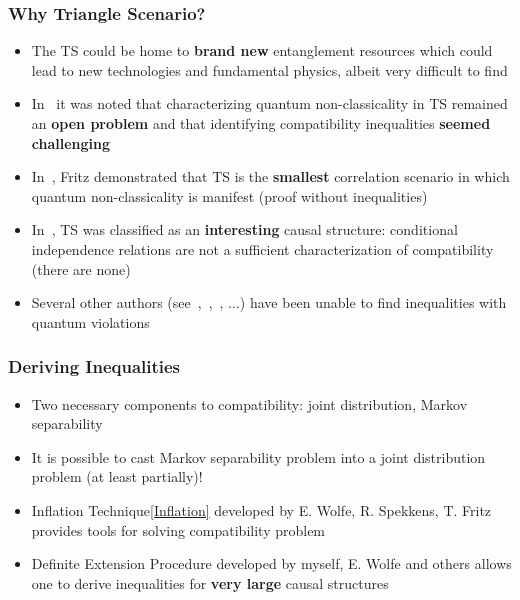 \documentclass[
    hyperref={bookmarks=false},%
    xcolor={dvipsnames},
]{beamer}
\renewcommand{\term}[1]{\textcolor{Mahogany}{#1}}
\begin{document}
\begin{frame}
    \frametitle{Why Triangle Scenario?}
    \begin{itemize}
        \item The TS could be home to \textbf{brand new} entanglement resources which could lead to new technologies and fundamental physics, albeit very difficult to find
        \item In~\cite{Branciard_2012} it was noted that characterizing quantum non-classicality in TS remained an \textbf{open problem} and that identifying compatibility inequalities \textbf{seemed challenging}
        \item In~\cite{Fritz_2012}, Fritz demonstrated that TS is the \textbf{smallest} correlation scenario in which quantum non-classicality is manifest (proof without inequalities)
        \item In~\cite{Henson_2014}, TS was classified as an \textbf{interesting} causal structure: conditional independence relations are not a sufficient characterization of compatibility (there are none)
        \item Several other authors (see~\cite{Steudel_2010},~\cite{Chaves_2014},~\cite{Inflation}, $\ldots$) have been unable to find inequalities with quantum violations
    \end{itemize}
\end{frame}

\begin{frame}
    \frametitle{Deriving Inequalities}
    \begin{itemize}
        \item Two necessary components to compatibility: joint distribution, Markov separability
        \item It is possible to cast Markov separability problem into a joint distribution problem (at least partially)!
        \item \term{Inflation Technique}\cref{Inflation} developed by E. Wolfe, R. Spekkens, T. Fritz provides tools for solving compatibility problem
        \item \term{Definite Extension Procedure} developed by myself, E. Wolfe and others allows one to derive inequalities for \textbf{very large} causal structures
    \end{itemize}
\end{frame}
\end{document}
